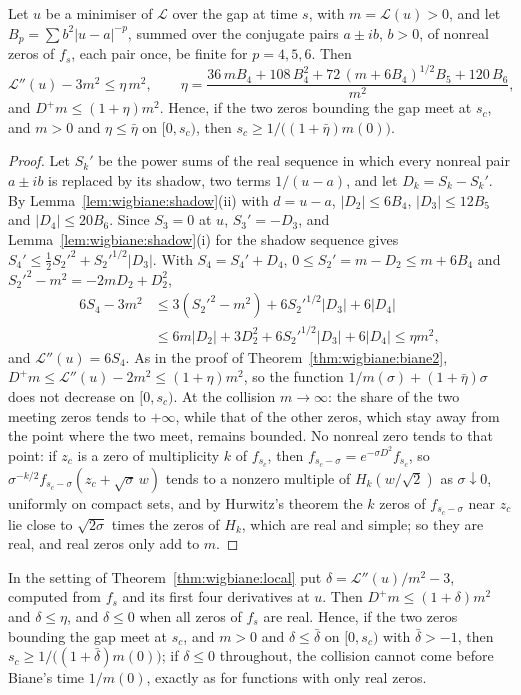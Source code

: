 \begin{theorem}\label{thm:wigbiane:local}
Let $u$ be a minimiser of $\mathcal L$ over the gap at time $s$, with $m=\mathcal L(u)>0$, and let $B_p=\sum b^2|u-a|^{-p}$, summed over the conjugate pairs $a\pm ib$, $b>0$, of nonreal zeros of $f_s$, each pair once, be finite for $p=4,5,6$. Then
\[
\mathcal L''(u)-3m^2\le\eta\,m^2,\qquad\eta=\frac{36\,mB_4+108\,B_4^2+72\,(m+6B_4)^{1/2}B_5+120\,B_6}{m^2},
\]
and $D^+m\le(1+\eta)m^2$. Hence, if the two zeros bounding the gap meet at $s_c$, and $m>0$ and $\eta\le\bar\eta$ on $[0,s_c)$, then $s_c\ge1/\big((1+\bar\eta)m(0)\big)$.
\end{theorem}

\begin{proof}
Let $S_k'$ be the power sums of the real sequence in which every nonreal pair $a\pm ib$ is replaced by its shadow, two terms $1/(u-a)$, and let $D_k=S_k-S_k'$. By Lemma~\ref{lem:wigbiane:shadow}(ii) with $d=u-a$, $|D_2|\le6B_4$, $|D_3|\le12B_5$ and $|D_4|\le20B_6$. Since $S_3=0$ at $u$, $S_3'=-D_3$, and Lemma~\ref{lem:wigbiane:shadow}(i) for the shadow sequence gives $S_4'\le\frac12S_2'^2+S_2'^{1/2}|D_3|$. With $S_4=S_4'+D_4$, $0\le S_2'=m-D_2\le m+6B_4$ and $S_2'^2-m^2=-2mD_2+D_2^2$,
\begin{align*}
6S_4-3m^2&\le3(S_2'^2-m^2)+6S_2'^{1/2}|D_3|+6|D_4|\\
&\le6m|D_2|+3D_2^2+6S_2'^{1/2}|D_3|+6|D_4|\le\eta m^2,
\end{align*}
and $\mathcal L''(u)=6S_4$. As in the proof of Theorem~\ref{thm:wigbiane:biane2}, $D^+m\le\mathcal L''(u)-2m^2\le(1+\eta)m^2$, so the function $1/m(\sigma)+(1+\bar\eta)\sigma$ does not decrease on $[0,s_c)$. At the collision $m\to\infty$: the share of the two meeting zeros tends to $+\infty$, while that of the other zeros, which stay away from the point where the two meet, remains bounded. No nonreal zero tends to that point: if $z_c$ is a zero of multiplicity $k$ of $f_{s_c}$, then $f_{s_c-\sigma}=e^{-\sigma D^2}f_{s_c}$, so $\sigma^{-k/2}f_{s_c-\sigma}(z_c+\sqrt\sigma\,w)$ tends to a nonzero multiple of $H_k(w/\sqrt2)$ as $\sigma\downarrow0$, uniformly on compact sets, and by Hurwitz's theorem the $k$ zeros of $f_{s_c-\sigma}$ near $z_c$ lie close to $\sqrt{2\sigma}$ times the zeros of $H_k$, which are real and simple; so they are real, and real zeros only add to $m$.
\end{proof}

\begin{corollary}\label{cor:wigbiane:delta}
In the setting of Theorem~\ref{thm:wigbiane:local} put $\delta=\mathcal L''(u)/m^2-3$, computed from $f_s$ and its first four derivatives at $u$. Then $D^+m\le(1+\delta)m^2$ and $\delta\le\eta$, and $\delta\le0$ when all zeros of $f_s$ are real. Hence, if the two zeros bounding the gap meet at $s_c$, and $m>0$ and $\delta\le\bar\delta$ on $[0,s_c)$ with $\bar\delta>-1$, then $s_c\ge1/\big((1+\bar\delta)m(0)\big)$; if $\delta\le0$ throughout, the collision cannot come before Biane's time $1/m(0)$, exactly as for functions with only real zeros.
\end{corollary}

